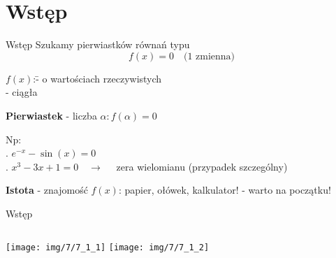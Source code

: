 \section{Wstęp}
\begin{frame}{Wstęp}
    Szukamy pierwiastków równań typu
    \[
    f(x) = 0 \quad \textrm{(1 zmienna)}
    \]
    \begin{tabbing}
	    $f(x)$:\quad \= - o wartościach rzeczywistych\\
	    \> - ciągła
    \end{tabbing}
	{\bf Pierwiastek} - liczba $\alpha : f(\alpha) = 0$
	\begin{tabbing}
		Np:\\
		. $e^{-x} - \sin(x) = 0$\\
		. $x^{3} - 3x + 1 = 0 \quad\rightarrow\quad$ zera wielomianu (przypadek szczególny)
	\end{tabbing}
	{\bf Istota} - znajomość $f(x)$: papier, ołówek, kalkulator! - warto na początku!
\end{frame}
\begin{frame}{Wstęp}
	\begin{columns}
		\centering   \texttt{[image: img/7/7\_1\_1]}
		\centering   \texttt{[image: img/7/7\_1\_2]}
	\end{columns}
\end{frame}
